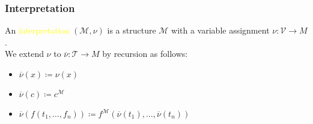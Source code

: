 \documentclass[UTF8,aspectratio=43,11pt,colorlinks,compress,openany]{beamer}%
\begin{document}
\begin{frame}\frametitle{Interpretation}
		An \textcolor{yellow}{interpretation} $(\mathcal{M},\nu)$ is a structure $\mathcal{M}$ with a variable assignment $\nu:\mathcal{V}\to M$.\\
		We extend $\nu$ to $\overline{\nu}:\mathcal{T}\to M$ by recursion as follows:\\
		\vspace{2ex}
		\begin{block}{}
			\begin{itemize}
				\item $\overline{\nu}(x)\coloneqq \nu(x)$
				\item $\overline{\nu}(c)\coloneqq c^{\mathcal{M}}$
				\item $\overline{\nu}(f(t_1,\dots,f_n))\coloneqq f^{\mathcal{M}}(\overline{\nu}(t_1),\dots,\overline{\nu}(t_n))$
			\end{itemize}
		\end{block}
		\centering{}
\end{frame}
\end{document}
